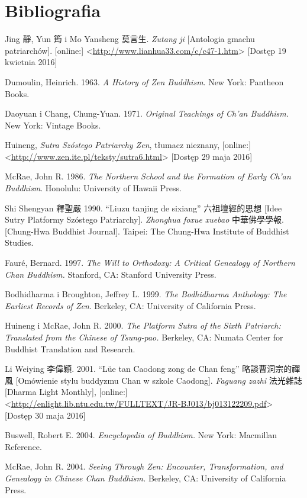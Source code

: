 \onecolumn
\chapter*{Bibliografia}

Jing 靜, Yun 筠 i Mo Yansheng 莫言生. \textit{Zutang ji} [Antologia gmachu patriarchów]. [online:] <\url{http://www.lianhua33.com/c/c47-1.htm}> [Dostęp 19 kwietnia 2016]

Dumoulin, Heinrich. 1963. \textit{A History of Zen Buddhism}. New York: Pantheon Books.

Daoyuan i Chang, Chung-Yuan. 1971. \textit{Original Teachings of Ch'an Buddhism.} New York: Vintage Books.

Huineng, \textit{Sutra Szóstego Patriarchy Zen}, tłumacz nieznany, [online:] <\url{http://www.zen.ite.pl/teksty/sutra6.html}> [Dostęp 29 maja 2016]

McRae, John R. 1986. \textit{The Northern School and the Formation of Early Ch'an Buddhism}. Honolulu: University of Hawaii Press.

Shi Shengyan 釋聖嚴 1990. ``Liuzu tanjing de sixiang'' 六祖壇經的思想 [Idee Sutry Platformy Szóstego Patriarchy]. \textit{Zhonghua foxue xuebao} 中華佛學學報. [Chung-Hwa Buddhist Journal]. Taipei: The Chung-Hwa Institute of Buddhist Studies.

Fauré, Bernard. 1997. \textit{The Will to Orthodoxy: A Critical Genealogy of Northern Chan Buddhism.} Stanford, CA: Stanford University Press.

Bodhidharma i Broughton, Jeffrey L. 1999. \textit{The Bodhidharma Anthology: The Earliest Records of Zen}. Berkeley, CA: University of California Press.

Huineng i McRae, John R. 2000. \textit{The Platform Sutra of the Sixth Patriarch: Translated from the Chinese of Tsung-pao.} Berkeley, CA: Numata Center for Buddhist Translation and Research.

Li Weiying 李偉穎. 2001. ``Lüe tan Caodong zong de Chan feng'' 略談曹洞宗的禪風 [Omówienie stylu buddyzmu Chan w szkole Caodong]. \textit{Faguang zazhi} 法光雜誌 [Dharma Light Monthly], [online:] <\url{http://enlight.lib.ntu.edu.tw/FULLTEXT/JR-BJ013/bj013122209.pdf}> [Dostęp 30 maja 2016]

Buswell, Robert E. 2004. \textit{Encyclopedia of Buddhism.} New York: Macmillan Reference.

McRae, John R. 2004. \textit{Seeing Through Zen: Encounter, Transformation, and Genealogy in Chinese Chan Buddhism.} Berkeley, CA: University of California Press.

